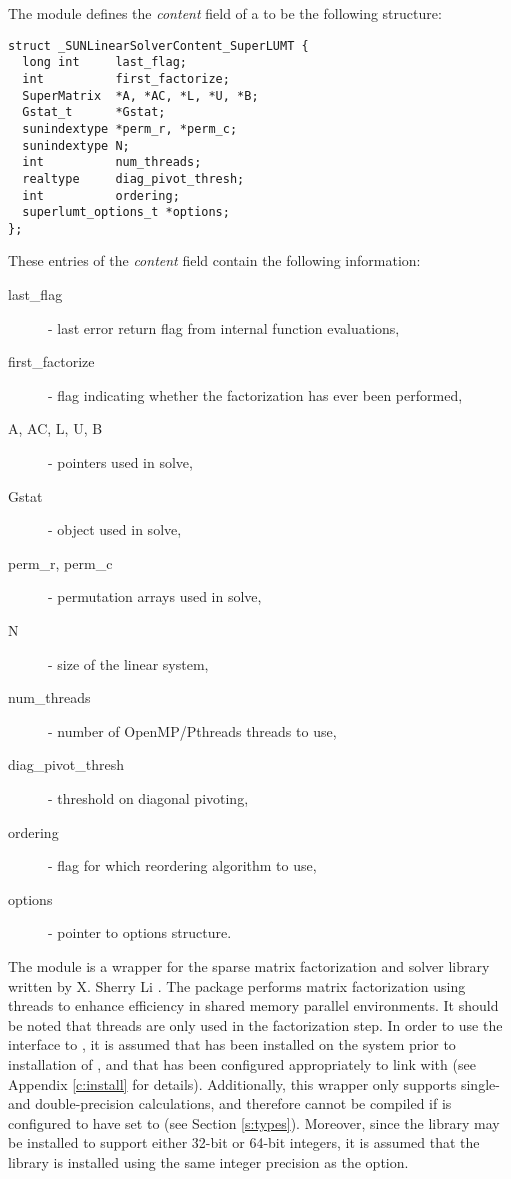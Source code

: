 The {\sunlinsolslumt} module defines the {\em
content} field of a  to be the following structure:
\begin{verbatim} 
struct _SUNLinearSolverContent_SuperLUMT {
  long int     last_flag;
  int          first_factorize;
  SuperMatrix  *A, *AC, *L, *U, *B;
  Gstat_t      *Gstat;
  sunindextype *perm_r, *perm_c;
  sunindextype N;
  int          num_threads;
  realtype     diag_pivot_thresh; 
  int          ordering;
  superlumt_options_t *options;
};
\end{verbatim}
These entries of the \emph{content} field contain the following
information:
\begin{description}
  \item[last\_flag] - last error return flag from internal function evaluations,
  \item[first\_factorize] - flag indicating whether the factorization
    has ever been performed, 
  \item[A, AC, L, U, B] -  pointers used in solve,
  \item[Gstat] -  object used in solve,
  \item[perm\_r, perm\_c] - permutation arrays used in solve,
  \item[N] - size of the linear system,
  \item[num\_threads] - number of OpenMP/Pthreads threads to use,
  \item[diag\_pivot\_thresh] - threshold on diagonal pivoting,
  \item[ordering] - flag for which reordering algorithm to use,
  \item[options] - pointer to {\superlumt} options structure.
\end{description}

{\warn} The {\sunlinsolslumt} module is a {\sunlinsol} wrapper for
the {\superlumt} sparse matrix factorization and solver library
written by X. Sherry Li \cite{SuperLUMT_site,Li:05,DGL:99}.  The
package performs matrix factorization using threads to enhance
efficiency in shared memory parallel environments.  It should be noted
that threads are only used in the factorization step.  In
order to use the {\sunlinsolslumt} interface to {\superlumt}, it is
assumed that {\superlumt} has been installed on the system prior to
installation of {\sundials}, and that {\sundials} has been configured
appropriately to link with {\superlumt} (see Appendix \ref{c:install}
for details).  Additionally, this wrapper only supports single- and
double-precision calculations, and therefore cannot be compiled if
{\sundials} is configured to have  set to 
(see Section \ref{s:types}).  Moreover, since the {\superlumt} library
may be installed to support either 32-bit or 64-bit integers, it is
assumed that the {\superlumt} library is installed using the same
integer precision as the {\sundials}  option.

